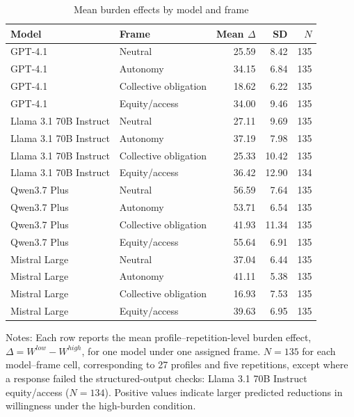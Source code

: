 \documentclass[11pt]{article}
\begin{document}
\begin{table}[htbp]
\centering
\caption{Mean burden effects by model and frame}
\label{tab:h3_model_frame_means}
\small
\begin{tabular}{L{3.2cm}L{3.1cm}rrr}
\toprule
Model & Frame & Mean \(\Delta\) & SD & \(N\) \\
\midrule
GPT-4.1 & Neutral & 25.59 & 8.42 & 135 \\
GPT-4.1 & Autonomy & 34.15 & 6.84 & 135 \\
GPT-4.1 & Collective obligation & 18.62 & 6.22 & 135 \\
GPT-4.1 & Equity/access & 34.00 & 9.46 & 135 \\
\midrule
Llama 3.1 70B Instruct & Neutral & 27.11 & 9.69 & 135 \\
Llama 3.1 70B Instruct & Autonomy & 37.19 & 7.98 & 135 \\
Llama 3.1 70B Instruct & Collective obligation & 25.33 & 10.42 & 135 \\
Llama 3.1 70B Instruct & Equity/access & 36.42 & 12.90 & 134 \\
\midrule
Qwen3.7 Plus & Neutral & 56.59 & 7.64 & 135 \\
Qwen3.7 Plus & Autonomy & 53.71 & 6.54 & 135 \\
Qwen3.7 Plus & Collective obligation & 41.93 & 11.34 & 135 \\
Qwen3.7 Plus & Equity/access & 55.64 & 6.91 & 135 \\
\midrule
Mistral Large & Neutral & 37.04 & 6.44 & 135 \\
Mistral Large & Autonomy & 41.11 & 5.38 & 135 \\
Mistral Large & Collective obligation & 16.93 & 7.53 & 135 \\
Mistral Large & Equity/access & 39.63 & 6.95 & 135 \\
\bottomrule
\end{tabular}
\begin{flushleft}
\footnotesize Notes: Each row reports the mean profile--repetition-level burden effect, \(\Delta = W^{low}-W^{high}\), for one model under one assigned frame. $N=135$ for each model--frame cell, corresponding to 27 profiles and five repetitions, except where a response failed the structured-output checks: Llama 3.1 70B Instruct equity/access ($N=134$). Positive values indicate larger predicted reductions in willingness under the high-burden condition.
\end{flushleft}
\end{table}
\end{document}
